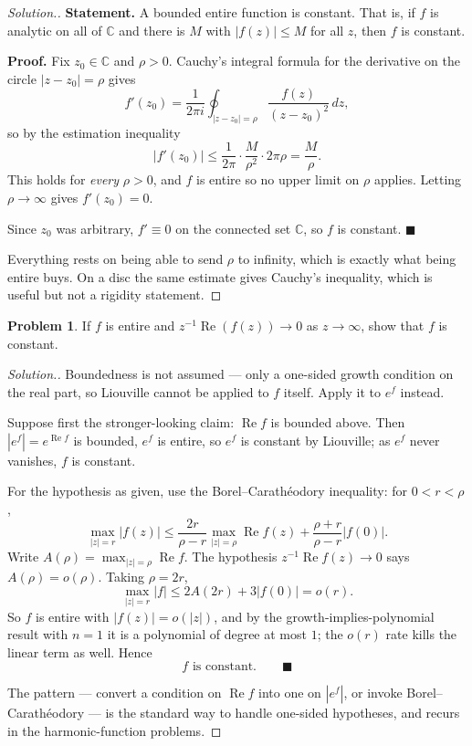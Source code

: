 \documentclass[11pt,a4paper]{article}
\theoremstyle{definition}
\newtheorem{problemx}{Problem}[section]
\newenvironment{problem}{\begin{problemx}}{\end{problemx}}
\newenvironment{solution}
  {\renewcommand{\qedsymbol}{}\begin{proof}[\textit{Solution}.]}
  {\end{proof}}
\begin{document}
\begin{solution}
\textbf{Statement.} A bounded entire function is constant. That is, if $f$ is
analytic on all of $\mathbb{C}$ and there is $M$ with $\left|f(z)\right| \leq M$
for all $z$, then $f$ is constant.

\textbf{Proof.} Fix $z_0 \in \mathbb{C}$ and $\rho > 0$. Cauchy's integral formula
for the derivative on the circle $\left|z-z_0\right| = \rho$ gives
$$f'(z_0) = \frac{1}{2\pi i}\oint_{\left|z-z_0\right|=\rho}
\frac{f(z)}{(z-z_0)^{2}}\,dz ,$$
so by the estimation inequality
$$\left|f'(z_0)\right| \leq \frac{1}{2\pi}\cdot\frac{M}{\rho^{2}}\cdot 2\pi\rho
= \frac{M}{\rho}.$$
This holds for \emph{every} $\rho > 0$, and $f$ is entire so no upper limit on
$\rho$ applies. Letting $\rho \to \infty$ gives $f'(z_0) = 0$.

Since $z_0$ was arbitrary, $f' \equiv 0$ on the connected set $\mathbb{C}$, so $f$
is constant. $\blacksquare$

Everything rests on being able to send $\rho$ to infinity, which is exactly what
being entire buys. On a disc the same estimate gives Cauchy's inequality, which is
useful but not a rigidity statement.
\end{solution}


\begin{problem}
If $f$ is entire and $z^{-1}\operatorname{Re}(f(z)) \rightarrow 0$ as
$z \rightarrow \infty$, show that $f$ is constant.
\end{problem}

\begin{solution}
Boundedness is not assumed --- only a one-sided growth condition on the real part,
so Liouville cannot be applied to $f$ itself. Apply it to $e^{f}$ instead.

Suppose first the stronger-looking claim: $\operatorname{Re}f$ is bounded above.
Then $\left|e^{f}\right| = e^{\operatorname{Re}f}$ is bounded, $e^{f}$ is entire, so
$e^{f}$ is constant by Liouville; as $e^{f}$ never vanishes, $f$ is constant.

For the hypothesis as given, use the Borel--Carath\'eodory inequality: for
$0 < r < \rho$,
$$\max_{\left|z\right|=r}\left|f(z)\right|
\leq \frac{2r}{\rho-r}\max_{\left|z\right|=\rho}\operatorname{Re}f(z)
+ \frac{\rho+r}{\rho-r}\left|f(0)\right| .$$
Write $A(\rho) = \max_{\left|z\right|=\rho}\operatorname{Re}f$. The hypothesis
$z^{-1}\operatorname{Re}f(z) \rightarrow 0$ says $A(\rho) = o(\rho)$. Taking
$\rho = 2r$,
$$\max_{\left|z\right|=r}\left|f\right| \leq 2A(2r) + 3\left|f(0)\right|
= o(r) .$$
So $f$ is entire with $\left|f(z)\right| = o(\left|z\right|)$, and by the
growth-implies-polynomial result with $n = 1$ it is a polynomial of degree at most
$1$; the $o(r)$ rate kills the linear term as well. Hence
$$\boxed{f \text{ is constant.}} \qquad \blacksquare$$

The pattern --- convert a condition on $\operatorname{Re}f$ into one on
$\left|e^{f}\right|$, or invoke Borel--Carath\'eodory --- is the standard way to
handle one-sided hypotheses, and recurs in the harmonic-function problems.
\end{solution}
\end{document}
